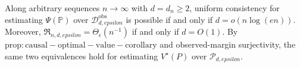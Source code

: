 Along arbitrary sequences \(n\to\infty\) with \(d=d_n\geq2\), uniform consistency for estimating \(\Psi(\mathbb P)\) over \(\mathcal D_{d,epsilon}^{\mathrm{obs}}\) is possible if and only if \(d=o(n\log(en))\).  Moreover, \(\mathfrak R_{n,d,epsilon}=\Theta_\epsilon(n^{-1})\) if and only if \(d=O(1)\).  By \(\mathrm{prop:causal-optimal-value-corollary}\) and observed-margin surjectivity, the same two equivalences hold for estimating \(V^\star(P)\) over \(\mathcal P_{d,epsilon}\).